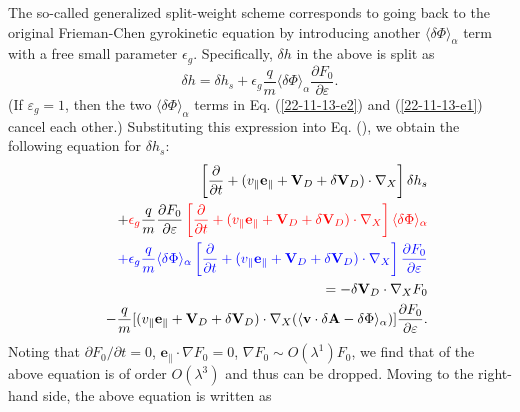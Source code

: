 \documentclass{llncs}
\newcommand{\tmcolor}[2]{{\color{#1}{#2}}}
\begin{document}
The so-called generalized split-weight scheme corresponds to going back to the
original Frieman-Chen gyrokinetic equation by introducing another $\langle
\delta \Phi \rangle_{\alpha}$ term with a free small parameter $\epsilon_g$.
Specifically, $\delta h$ in the above is split as
\begin{equation}
  \label{22-11-13-e1} \delta h = \delta h_s + \epsilon_g \frac{q}{m} \langle
  \delta \Phi \rangle_{\alpha} \frac{\partial F_0}{\partial \varepsilon} .
\end{equation}
(If $\varepsilon_g = 1$, then the two $\langle \delta \Phi \rangle_{\alpha}$
terms in Eq. (\ref{22-11-13-e2}) and (\ref{22-11-13-e1}) cancel each other.)
Substituting this expression into Eq. (), we obtain the following equation for
$\delta h_s$:
\begin{eqnarray}
  &  & \left[ \frac{\partial}{\partial t} + (v_{\parallel}
  \mathbf{e}_{\parallel} +\mathbf{V}_D + \delta \mathbf{V}_D) \cdot \nabla_X
  \right] \delta h_s \nonumber\\
  &  & + \tmcolor{red}{\epsilon_g \tmcolor{black}{\frac{q}{m} \frac{\partial
  F_0}{\partial \varepsilon}} \left[ \frac{\partial}{\partial t} +
  (v_{\parallel} \mathbf{e}_{\parallel} +\mathbf{V}_D + \delta \mathbf{V}_D)
  \cdot \nabla_X \right] \langle \delta \Phi \rangle_{\alpha}} \nonumber\\
  &  & \tmcolor{blue}{+ \epsilon_g \frac{q}{m} \langle \delta \Phi
  \rangle_{\alpha} \left[ \frac{\partial}{\partial t} + (v_{\parallel}
  \mathbf{e}_{\parallel} +\mathbf{V}_D + \delta \mathbf{V}_D) \cdot \nabla_X
  \right] \frac{\partial F_0}{\partial \varepsilon}} \nonumber\\
  &  & = - \delta \mathbf{V}_D \cdot \nabla_X F_0 \nonumber\\
  &  & - \frac{q}{m} [(v_{\parallel} \mathbf{e}_{\parallel} +\mathbf{V}_D +
  \delta \mathbf{V}_D) \cdot \nabla_X (\langle \mathbf{v} \cdot \delta
  \mathbf{A}- \delta \Phi \rangle_{\alpha})] \frac{\partial F_0}{\partial
  \varepsilon} .  \label{19-1-10-7m}
\end{eqnarray}
Noting that $\partial F_0 / \partial t = 0$, $\mathbf{e}_{\parallel} \cdot
\nabla F_0 = 0$, $\nabla F_0 \sim O (\lambda^1) F_0$, we find that
\tmcolor{blue}{the third line} of the above equation is of order $O
(\lambda^3)$ and thus can be dropped. Moving \tmcolor{red}{the second line} to
the right-hand side, the above equation is written as
\end{document}

